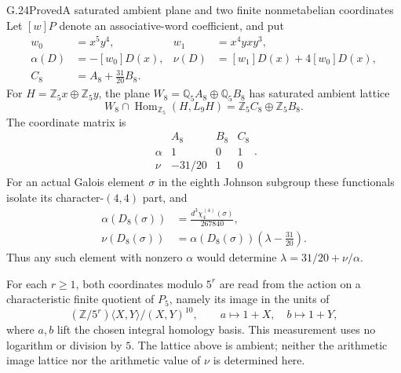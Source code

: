 \begin{statement}{G.24}{Proved}{A saturated ambient plane and two finite nonmetabelian coordinates}
Let $[w]P$ denote an associative-word coefficient, and put
\[
 \begin{aligned}
 w_0&=x^5y^4,& w_1&=x^4yxy^3,\\
 \alpha(D)&=-[w_0]D(x),&
 \nu(D)&=[w_1]D(x)+4[w_0]D(x),\\
 C_8&=A_8+\frac{31}{20}B_8.
 \end{aligned}
\]
For $H=\mathbb Z_5x\oplus\mathbb Z_5y$, the plane
$W_8=\mathbb Q_5A_8\oplus\mathbb Q_5B_8$ has saturated ambient lattice
\[
 W_8\cap\operatorname{Hom}_{\mathbb Z_5}(H,L_9H)
               =\mathbb Z_5C_8\oplus\mathbb Z_5B_8.
\]
The coordinate matrix is
\[
 \begin{array}{c|rrr}
       &A_8&B_8&C_8\\\hline
 \alpha&1&0&1\\
 \nu&-31/20&1&0
 \end{array}.
\]
For an actual Galois element $\sigma$ in the eighth Johnson
subgroup these functionals isolate its character-$(4,4)$ part,
and
\[
 \begin{aligned}
 \alpha(D_8(\sigma))&=\frac{d^3\chi^{(4)}_4(\sigma)}{267840},\\
 \nu(D_8(\sigma))&=\alpha(D_8(\sigma))
                         \left(\lambda-\frac{31}{20}\right).
 \end{aligned}
\]
Thus any such element with nonzero $\alpha$ would determine
$\lambda=31/20+\nu/\alpha$.

For each $r\ge1$, both coordinates modulo $5^r$ are read from
the action on a characteristic finite quotient of $P_5$, namely
its image in the units of
\[
 (\mathbb Z/5^r)\langle X,Y\rangle/(X,Y)^{10},
 \qquad a\longmapsto1+X,\quad b\longmapsto1+Y,
\]
where $a,b$ lift the chosen integral homology basis.
This measurement uses no logarithm or division by $5$.
The lattice above is ambient; neither the arithmetic image
lattice nor the arithmetic value of $\nu$ is determined here.
\end{statement}
